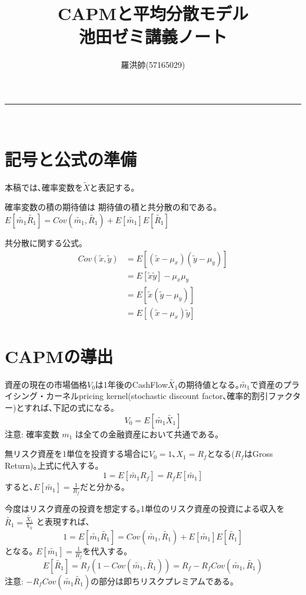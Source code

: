 \documentclass[uplatex,a4paper]{jsarticle}
\title{CAPMと平均分散モデル \\池田ゼミ講義ノート}
\author{羅洪帥(57165029)}
\date{}
\begin{document}
\maketitle
\hrule
\medskip　　

\section{記号と公式の準備}
本稿では､確率変数を$\tilde{X}$と表記する｡


確率変数の積の期待値は 期待値の積と共分散の和である｡
$
E [\widetilde{m_1} \widetilde{R_1}] = Cov(\widetilde{m_1}, \widetilde{R_1}) +  E [\widetilde{m_1} ] E [ \widetilde{R_1}]
$

共分散に関する公式｡
\begin{align*}
Cov(\widetilde{x}, \widetilde{y})
& = E[(\widetilde{x} - \mu_x)(\widetilde{y} - \mu_y)]  \\
& = E[\tilde{x} \tilde{y}] - \mu_x \mu_y  \\
& = E[\tilde{x} (\tilde{y} - \mu_y  )]\\
& = E[(\tilde{x} - \mu_x  ) \tilde{y} ]
\end{align*}


\section{CAPMの導出}

資産の現在の市場価格$V_0$は1年後のCashFlow$\widetilde{X_1}$の期待値となる｡$\widetilde{m_1}$で資産のプライシング・カーネルpricing kernel(stochastic discount factor､確率的割引ファクター)とすれば､下記の式になる｡
\begin{equation*}
V_0 = E [\widetilde{m_1} \widetilde{X_1}]
\end{equation*}
注意: 確率変数 $ m_{1}$  は全ての金融資産において共通である｡

無リスク資産を1単位を投資する場合に$V_0 = 1$､$X_1 = R_f$となる($R_f$はGross Return)｡上式に代入する｡
\begin{equation*}
1 = E [\widetilde{m_1} R_f] = R_f E [\widetilde{m_1}]
\end{equation*}
すると､$\displaystyle E [\widetilde{m_1}] = \frac{1}{R_f}$だと分かる｡

今度はリスク資産の投資を想定する｡1単位のリスク資産の投資による収入を
$\displaystyle \widetilde{R_1} = \frac{\widetilde{X_1}}{V_0}$
と表現すれば､
\begin{equation*}
1 = E [\widetilde{m_1} \widetilde{R_1}] = Cov(\widetilde{m_1}, \widetilde{R_1}) +  E [\widetilde{m_1} ] E [ \widetilde{R_1}]
\end{equation*}
となる｡
$ E [\widetilde{m_1}] = \frac{1}{R_f}$を代入する｡
\begin{equation*}
E [ \widetilde{R_1}] = R_f \left ( 1- Cov(\widetilde{m_1}, \widetilde{R_1})\right ) =
R_f - R_f Cov(\widetilde{m_1}, \widetilde{R_1})
\end{equation*}
注意: $ - R_f Cov(\widetilde{m_1} \widetilde{R_1})$の部分は即ちリスクプレミアムである｡
\end{document}
